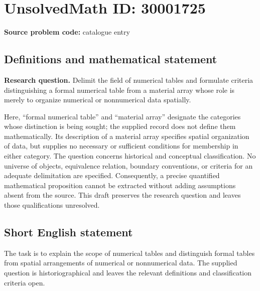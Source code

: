 \documentclass[11pt]{article}
\begin{document}
\section*{UnsolvedMath ID: 30001725}
\textbf{Source problem code:} catalogue entry
\subsection{Definitions and mathematical statement}
\textbf{Research question.} Delimit the field of numerical tables and formulate criteria distinguishing a formal numerical table from a material array whose role is merely to organize numerical or nonnumerical data spatially.

Here, ``formal numerical table'' and ``material array'' designate the categories whose distinction is being sought; the supplied record does not define them mathematically. Its description of a material array specifies spatial organization of data, but supplies no necessary or sufficient conditions for membership in either category. The question concerns historical and conceptual classification. No universe of objects, equivalence relation, boundary conventions, or criteria for an adequate delimitation are specified. Consequently, a precise quantified mathematical proposition cannot be extracted without adding assumptions absent from the source. This draft preserves the research question and leaves those qualifications unresolved.
\subsection{Short English statement}
The task is to explain the scope of numerical tables and distinguish formal tables from spatial arrangements of numerical or nonnumerical data. The supplied question is historiographical and leaves the relevant definitions and classification criteria open.
\end{document}
